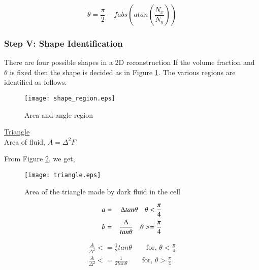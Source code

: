 % 
% 
\begin{equation}
 \theta=\frac{\pi}{2}-fabs\left(atan\left(\frac{N_x}{N_y}\right)\right)
 \end{equation}
 
\subsubsection{Step V: Shape Identification}
There are four possible shapes in a 2D reconstruction 
If the volume fraction and $\theta$ is fixed then the shape is decided as in Figure \ref{Fig:shape_region}. The various regions are identified as follows.
\begin{figure}
 \centering
    \texttt{[image: shape\_region.eps]}
  \caption{Area and angle region}
  \label{Fig:shape_region}
\end{figure}
\underline{Triangle}\\
Area of fluid, $A=\Delta^2F$ 

From Figure \ref{Fig:triangle}, we get,

\begin{figure}%
\centering
\texttt{[image: triangle.eps]}
\caption{Area of the triangle made by dark fluid in the cell}
\label{Fig:triangle}
\end{figure}

\begin{eqnarray*}
 a&=&\Delta tan\theta \text{\quad $\theta < \frac{\pi}{4}$} \\  
 b&=&\frac{\Delta}{tan\theta} \text{\quad $\theta >= \frac{\pi}{4}$}\\
\end{eqnarray*}

\begin{equation*}
\boxed{\begin{align}
    \frac{A}{\Delta^2} <= \frac{1}{2} tan\theta \qquad \text{for, }\theta < \frac{\pi}{4} \\
    \frac{A}{\Delta^2}<=  \frac{1}{2tan\theta} \qquad \text{for, }\theta > \frac{\pi}{4}   
    \end{align}}
\end{equation*}

